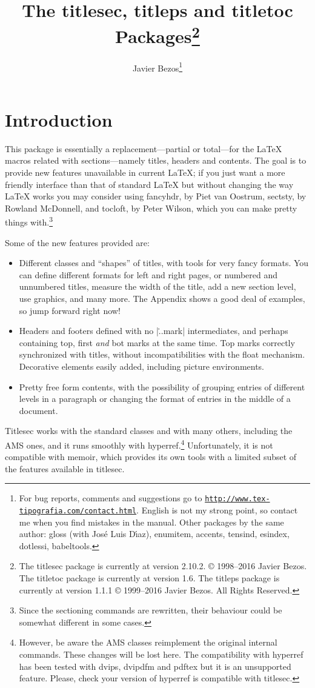 \documentclass[a4paper]{ltxguide}
\title{The \textsf{titlesec}, \textsf{titleps} and \textsf{titletoc} 
Packages\footnote{The \textsf{titlesec} package is currently at 
version 2.10.2.  \copyright{} 1998--2016 Javier Bezos.
The \textsf{titletoc} package is currently at 
version 1.6.  The \textsf{titleps} package is currently at version 
1.1.1 \copyright{} 1999--2016 Javier Bezos.  All Rights 
Reserved.}}
\author{Javier Bezos\footnote{For bug reports, comments and
suggestions go to \href{http://www.tex-tipografia.com/contact.html}%
{\texttt{http://www.tex-tipografia.com/contact.html}}.  English
is not my strong point, so contact me when you find mistakes in the
manual.  Other packages by the same author: \textsf{gloss} (with
Jos\'e Luis D\'{\i}az), \textsf{enumitem, accents, tensind, esindex,
dotlessi, babeltools}.}}
\date{\docdate}
\begin{document}
\maketitle
\tableofcontents
\section{Introduction}

This package is essentially a replacement---partial or total---for the 
\LaTeX{} macros related with sections---namely titles, headers and 
contents.  The goal is to provide new features unavailable in current 
\LaTeX{}; if you just want a more friendly interface than that of 
standard \LaTeX{} but without changing the way \LaTeX{} works you may 
consider using \textsf{fancyhdr}, by Piet van Oostrum, \textsf{sectsty},
by Rowland McDonnell, and \textsf{tocloft}, by Peter Wilson, which you
can make pretty things with.\footnote{Since the sectioning commands 
are rewritten, their behaviour could be somewhat different 
in some cases.}

Some of the new features provided are:
\begin{itemize}
\item Different classes and ``shapes'' of titles, with tools for very 
fancy formats.  You can define different formats for left and right 
pages, or numbered and unnumbered titles, measure the width of the 
title, add a new section level, use graphics, and many more.  The 
Appendix shows a good deal of examples, so jump forward right now!

\item Headers and footers defined with no |\...mark| intermediates,
and perhaps containing top, first \emph{and} bot marks at the same time.
Top marks correctly synchronized with titles, without 
incompatibilities with the float mechanism. Decorative elements easily
added, including picture environments.

\item Pretty free form contents, with the possibility of grouping 
entries of different levels in a paragraph or changing the format
of entries in the middle of a document.
\end{itemize}
\textsf{Titlesec} works with the standard classes and with many
others, including the AMS ones, and it runs smoothly with
\textsf{hyperref}.\footnote{However, be aware the AMS classes
reimplement the original internal commands.  These changes will be
lost here.  The compatibility with \textsf{hyperref} has been tested
with \textsf{dvips}, \textsf{dvipdfm} and \textsf{pdftex} but it is an
unsupported feature.  Please, check your version of
\textsf{hyperref} is compatible with \textsf{titlesec}.}
Unfortunately, it is not compatible with \textsf{memoir}, which
provides its own tools with a limited subset of the features available
in \textsf{titlesec}.
\end{document}
